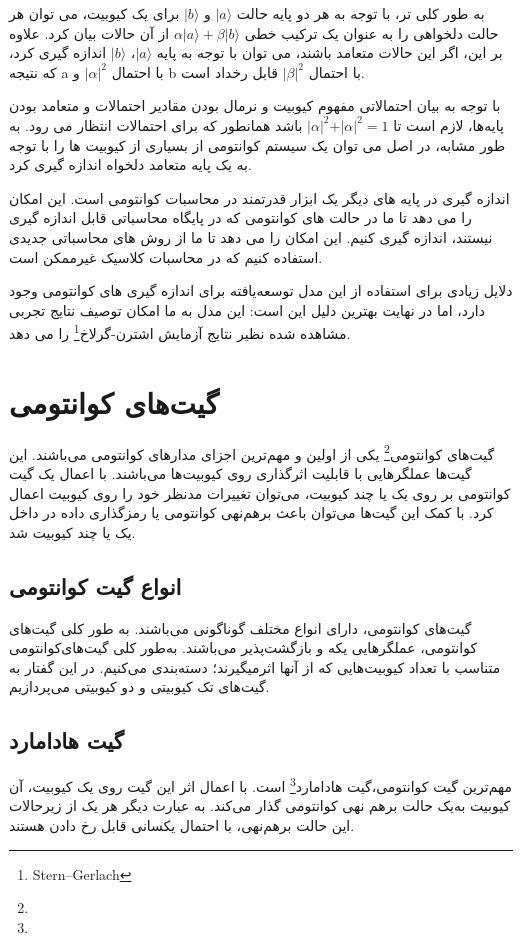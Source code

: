 \documentclass{book}
\begin{document}
به طور کلی تر، با توجه به هر دو پایه حالت $\vert a\rangle$ و $\vert b\rangle$ برای یک کیوبیت، می توان هر حالت دلخواهی را به عنوان یک ترکیب خطی $\alpha \vert a\rangle + \beta \vert b\rangle$ از آن حالات بیان کرد. علاوه بر این، اگر این حالات  متعامد باشند، می توان با توجه به پایه $\vert a\rangle$، $\vert b\rangle$ اندازه گیری کرد، که نتیجه a با احتمال $\vert\alpha\vert ^2$ و b با احتمال $\vert\beta\vert ^2$ قابل رخداد است.

با توجه به بیان احتمالاتی مفهوم کیوبیت و نرمال بودن مقادیر احتمالات و متعامد بودن پایه‌ها، لازم است تا $\vert\alpha\vert ^ 2 + \vert\alpha\vert ^ 2 = 1$ باشد همانطور که برای احتمالات انتظار می رود. به طور مشابه، در اصل می توان یک سیستم کوانتومی از بسیاری از کیوبیت ها را با توجه به یک پایه متعامد دلخواه اندازه گیری کرد.

اندازه گیری در پایه های دیگر یک ابزار قدرتمند در محاسبات کوانتومی است. این امکان را می دهد تا ما در حالت های کوانتومی که در پایگاه محاسباتی قابل اندازه گیری نیستند، اندازه گیری کنیم. این امکان را می دهد تا ما از روش های محاسباتی جدیدی استفاده کنیم که در محاسبات کلاسیک غیرممکن است.

دلایل زیادی برای استفاده از این مدل توسعه‌یافته برای اندازه گیری های کوانتومی وجود دارد، اما در نهایت بهترین دلیل این است: این مدل به ما امکان توصیف نتایج تجربی مشاهده شده نظیر نتایج آزمایش اشترن-گرلاخ\footnote{Stern–Gerlach} را می دهد.
\section{گیت‌های کوانتومی}
گیت‌های کوانتومی\footnote{} یکی از اولین و مهم‌ترین اجزای‌ مدار‌های کوانتومی ‌می‌باشند. این گیت‌ها عملگر‌هایی با قابلیت اثر‌گذاری روی کیوبیت‌ها می‌باشند. با اعمال یک گیت کوانتومی بر روی یک یا چند کیوبیت، می‌توان تغییرات مدنظر خود را روی کیوبیت اعمال کرد. با کمک این گیت‌ها می‌توان باعث برهم‌نهی کوانتومی یا رمز‌گذاری داده در داخل یک یا چند کیوبیت شد.

\subsection{انواع گیت کوانتومی}
گیت‌های کوانتومی، دارای انواع مختلف گوناگونی می‌باشند. به طور کلی گیت‌های کوانتومی، عملگر‌هایی یکه و بازگشت‌پذیر می‌باشند. به‌طور کلی گیت‌های‌کوانتومی متناسب با تعداد کیوبیت‌هایی که از آنها اثر‌میگیرند؛ دسته‌بندی می‌کنیم. در این گفتار به گیت‌های تک کیوبیتی و دو کیوبیتی می‌پردازیم.
\subsection*{گیت هادامارد}
مهم‌ترین گیت کوانتومی،‌گیت هادامارد\footnote{} است. با اعمال اثر این گیت روی یک کیوبیت، آن کیوبیت به‌یک حالت برهم نهی‌ کوانتومی‌ گذار‌ می‌کند. به عبارت دیگر هر یک از زیرحالات این حالت برهم‌نهی، با احتمال یکسانی قابل رخ دادن‌ هستند. 
\vspace{1cm}
\end{document}
